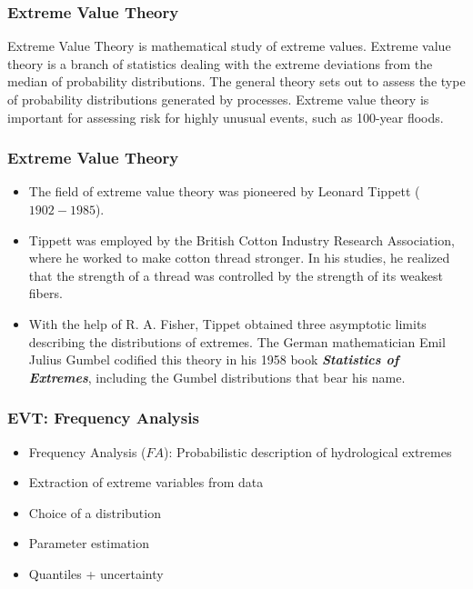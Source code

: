 \documentclass[MAIN.tex]{subfiles}
\begin{document}
\begin{frame}
\frametitle{Extreme Value Theory}
Extreme Value Theory is mathematical study of extreme values.
Extreme value theory is a branch of statistics dealing with the extreme deviations from the median of probability distributions. The general theory sets out to assess the type of probability distributions generated by processes. Extreme value theory is important for assessing risk for highly unusual events, such as 100-year floods.
\end{frame}
\begin{frame}
\frametitle{Extreme Value Theory}

\begin{itemize}
\item The field of extreme value theory was pioneered by Leonard Tippett ($1902-1985$). 
\item Tippett was employed by the British Cotton Industry Research Association, where he worked to make cotton thread stronger. In his studies, he realized that the strength of a thread was controlled by the strength of its weakest fibers.

\item With the help of R. A. Fisher, Tippet obtained three asymptotic limits describing the distributions of extremes. The German mathematician Emil Julius Gumbel codified this theory in his 1958 book \textbf{\emph{Statistics of Extremes}}, including the Gumbel distributions that bear his name.
\end{itemize}
\end{frame}
\begin{frame}
\frametitle{EVT: Frequency Analysis}
\begin{itemize}
	\item Frequency Analysis ($FA$): Probabilistic description of hydrological extremes
	\item Extraction of extreme variables from data
	\item Choice of a distribution
	\item Parameter estimation
	\item Quantiles + uncertainty
\end{itemize}
\end{frame}
\end{document}
